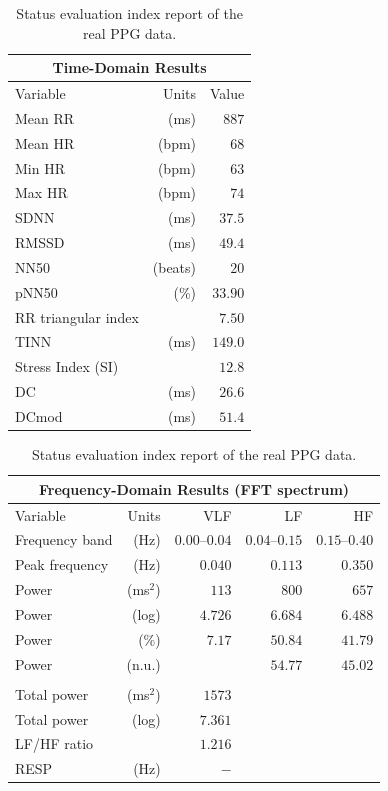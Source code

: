 \documentclass[sigchi,authordraft]{acmart}
\begin{document}
\begin{table}[!t]
  \small
  \centering
  \caption{Status evaluation index report of the real PPG data.}
  \begin{tabular}{lrr}
  \multicolumn{3}{c}{Time-Domain Results} \\
  \toprule
    Variable & Units & Value \\
    \midrule
    Mean RR & (ms) & $887$ \\
    Mean HR & (bpm) & $68$ \\
    Min HR & (bpm) & $63$ \\
    Max HR & (bpm) & $74$ \\
    SDNN & (ms) & $37.5$ \\
    RMSSD & (ms) & $49.4$ \\
    NN50 & (beats) & $20$ \\
    pNN50 & (\%) & $33.90$ \\
    RR triangular index & & $7.50$ \\
    TINN & (ms) & $149.0$ \\
    Stress Index (SI) & & $12.8$ \\
    DC & (ms) & $26.6$ \\
    DCmod & (ms) & $51.4$ \\
    \bottomrule
  \end{tabular}
  \begin{tabular}{lrrrr}
  \multicolumn{5}{c}{Frequency-Domain Results (FFT spectrum)} \\
  \toprule
    Variable & Units & VLF & LF & HF \\
    \midrule
    Frequency band & (Hz) & $0.00\text{--}0.04$ & $0.04\text{--}0.15$ & $0.15\text{--}0.40$ \\
    Peak frequency & (Hz) & $0.040$ & $0.113$ & $0.350$ \\
    Power & (ms${}^\text{2}$) & $113$ & $800$ & $657$ \\
    Power & (log) & $4.726$ & $6.684$ & $6.488$ \\
    Power & (\%) & $7.17$ & $50.84$ & $41.79$ \\
    Power & (n.u.) & & $54.77$ & $45.02$ \\
    \text{-}\text{-}\text{-}\text{-}\text{-}\text{-}\text{-}\text{-}\text{-}\text{-}\text{-}\text{-}\text{-} & & & & \\
    Total power & (ms${}^\text{2}$) & $1573$ & & \\
    Total power & (log) & $7.361$ & & \\
    LF/HF ratio & & $1.216$ & & \\
    RESP & (Hz) & $-$ & & \\
    \bottomrule
  \end{tabular}
  \label{tab:report_real}
\end{table}
\end{document}
